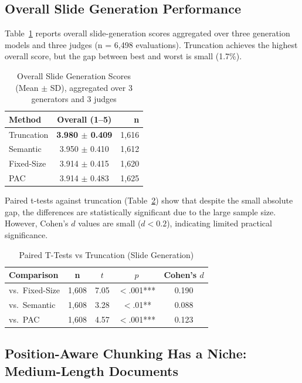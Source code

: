 \documentclass[journal]{IEEEtran}
\begin{document}
\subsection{Overall Slide Generation Performance}

Table~\ref{tab:slides_overall} reports overall slide-generation scores aggregated over three generation models and three judges (n = 6{,}498 evaluations). Truncation achieves the highest overall score, but the gap between best and worst is small (1.7\%).

\begin{table}[h]
\centering
\caption{Overall Slide Generation Scores (Mean $\pm$ SD), aggregated over 3 generators and 3 judges}
\label{tab:slides_overall}
\begin{tabular}{lcr}
\toprule
\textbf{Method} & \textbf{Overall (1--5)} & \textbf{n} \\
\midrule
Truncation & \textbf{3.980 $\pm$ 0.409} & 1{,}616 \\
Semantic & 3.950 $\pm$ 0.410 & 1{,}612 \\
Fixed-Size & 3.914 $\pm$ 0.415 & 1{,}620 \\
PAC & 3.914 $\pm$ 0.483 & 1{,}625 \\
\bottomrule
\end{tabular}
\end{table}

Paired t-tests against truncation (Table~\ref{tab:significance}) show that despite the small absolute gap, the differences are statistically significant due to the large sample size. However, Cohen's $d$ values are small ($d < 0.2$), indicating limited practical significance.

\begin{table}[h]
\centering
\caption{Paired T-Tests vs Truncation (Slide Generation)}
\label{tab:significance}
\footnotesize
\begin{tabular}{lcccc}
\toprule
\textbf{Comparison} & \textbf{n} & \textbf{$t$} & \textbf{$p$} & \textbf{Cohen's $d$} \\
\midrule
vs.\ Fixed-Size & 1{,}608 & 7.05 & $<$.001*** & 0.190 \\
vs.\ Semantic & 1{,}608 & 3.28 & $<$.01** & 0.088 \\
vs.\ PAC & 1{,}608 & 4.57 & $<$.001*** & 0.123 \\
\bottomrule
\end{tabular}
\end{table}

\subsection{Position-Aware Chunking Has a Niche: Medium-Length Documents}
\end{document}
